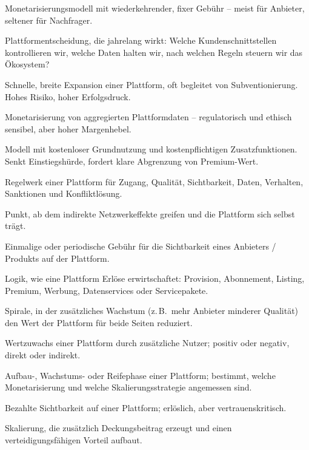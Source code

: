 \documentclass[11pt,a4paper,oneside]{article}
\begin{document}
\begin{description}[style=nextline,leftmargin=0pt,labelindent=0pt,itemsep=4pt]
  \item[Abonnement] Monetarisierungsmodell mit wiederkehrender, fixer Gebühr -- meist für Anbieter, seltener für Nachfrager.
  \item[Architekturentscheidung] Plattformentscheidung, die jahrelang wirkt: Welche Kundenschnittstellen kontrollieren wir, welche Daten halten wir, nach welchen Regeln steuern wir das Ökosystem?
  \item[Blitz-Skalierung] Schnelle, breite Expansion einer Plattform, oft begleitet von Subventionierung. Hohes Risiko, hoher Erfolgsdruck.
  \item[Datenservices] Monetarisierung von aggregierten Plattformdaten -- regulatorisch und ethisch sensibel, aber hoher Margenhebel.
  \item[Freemium] Modell mit kostenloser Grundnutzung und kostenpflichtigen Zusatzfunktionen. Senkt Einstiegshürde, fordert klare Abgrenzung von Premium-Wert.
  \item[Governance] Regelwerk einer Plattform für Zugang, Qualität, Sichtbarkeit, Daten, Verhalten, Sanktionen und Konfliktlösung.
  \item[Kritische Masse] Punkt, ab dem indirekte Netzwerkeffekte greifen und die Plattform sich selbst trägt.
  \item[Listing-Gebühr] Einmalige oder periodische Gebühr für die Sichtbarkeit eines Anbieters / Produkts auf der Plattform.
  \item[Monetarisierung] Logik, wie eine Plattform Erlöse erwirtschaftet: Provision, Abonnement, Listing, Premium, Werbung, Datenservices oder Servicepakete.
  \item[Negativer Netzwerkeffekt] Spirale, in der zusätzliches Wachstum (z.\,B.\ mehr Anbieter minderer Qualität) den Wert der Plattform für beide Seiten reduziert.
  \item[Netzwerkeffekt] Wertzuwachs einer Plattform durch zusätzliche Nutzer; positiv oder negativ, direkt oder indirekt.
  \item[Plattformphase] Aufbau-, Wachstums- oder Reifephase einer Plattform; bestimmt, welche Monetarisierung und welche Skalierungsstrategie angemessen sind.
  \item[Premium-Platzierung] Bezahlte Sichtbarkeit auf einer Plattform; erlöslich, aber vertrauenskritisch.
  \item[Profitable Skalierung] Skalierung, die zusätzlich Deckungsbeitrag erzeugt und einen verteidigungsfähigen Vorteil aufbaut.

\end{description}
\end{document}
